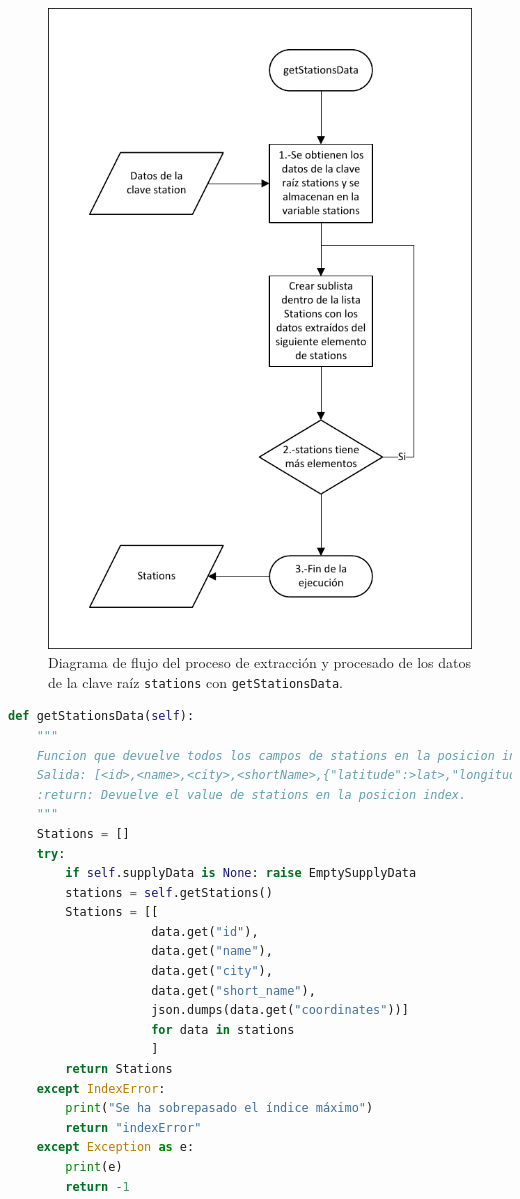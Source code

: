 \begin{figure}[htbp]
\centering
\includegraphics[width=.5\textwidth]{fig/Diagramas de flujo/getStationsData.pdf}
\caption{Diagrama de flujo del proceso de extracción y procesado de los datos de la clave raíz \texttt{stations} con \texttt{getStationsData}.}
\label{fig:DiagramaFlujoGetStationsData}
\end{figure}

\begin{lstlisting}[language=Python,
                   style=python,
                   frame=none,
                   numbers=none,
                   basicstyle=\ttfamily\normalsize,
                   caption={Función \texttt{getStationsData}},
                   label=src:functionGetStationsData,
                   inputencoding=utf8]                   
def getStationsData(self):
    """
    Funcion que devuelve todos los campos de stations en la posicion index ordenados en una lista como en el archivo Yaml.\n
    Salida: [<id>,<name>,<city>,<shortName>,{"latitude":>lat>,"longitude":<lon>}]
    :return: Devuelve el value de stations en la posicion index.
    """
    Stations = []
    try:
        if self.supplyData is None: raise EmptySupplyData
        stations = self.getStations()
        Stations = [[
                    data.get("id"),
                    data.get("name"),
                    data.get("city"),
                    data.get("short_name"),
                    json.dumps(data.get("coordinates"))]
                    for data in stations
                    ]
        return Stations
    except IndexError:
        print("Se ha sobrepasado el índice máximo")
        return "indexError"
    except Exception as e:
        print(e)
        return -1
\end{lstlisting}

